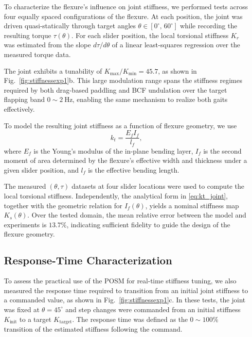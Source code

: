 To characterize the flexure's influence on joint stiffness, we performed tests across four equally spaced configurations of the flexure. At each position, the joint was driven quasi-statically through target angles \(\theta \in [0^\circ,\,60^\circ]\) while recording the resulting torque \(\tau(\theta)\). For each slider position, the local torsional stiffness \(K_r\) was estimated from the slope \(d\tau/d\theta\) of a linear least-squares regression over the measured torque data.

The joint exhibits a tunability of \(K_{\max}/K_{\min}=45.7\), as shown in Fig.~\ref{fig:stiffnessexp1}b. This large modulation range spans the stiffness regimes required by both drag-based paddling and BCF undulation over the target flapping band \(0\sim2~\mathrm{Hz}\), enabling the same mechanism to realize both gaits effectively.

To model the resulting joint stiffness as a function of flexure geometry, we use
\begin{equation}
k_t = \frac{E_f I_f}{l_f},
\label{eq:kt_joint}
\end{equation}
where \(E_f\) is the Young's modulus of the in-plane bending layer, \(I_f\) is the second moment of area determined by the flexure's effective width and thickness under a given slider position, and \(l_f\) is the effective bending length.

The measured \((\theta,\tau)\) datasets at four slider locations were used to compute the local torsional stiffness. Independently, the analytical form in \eqref{eq:kt_joint}, together with the geometric relation for \(I_f(\theta)\), yields a nominal stiffness map \(K_s(\theta)\). Over the tested domain, the mean relative error between the model and experiments is \(13.7\%\), indicating sufficient fidelity to guide the design of the flexure geometry.

\subsection{Response-Time Characterization}

To assess the practical use of the POSM for real-time stiffness tuning, we also measured the response time required to transition from an initial joint stiffness to a commanded value, as shown in Fig.~\ref{fig:stiffnessexp1}c. In these tests, the joint was fixed at \(\theta=45^{\circ}\) and step changes were commanded from an initial stiffness \(K_{\text{init}}\) to a target \(K_{\text{target}}\). The response time was defined as the \(0\sim100\%\) transition of the estimated stiffness following the command.

